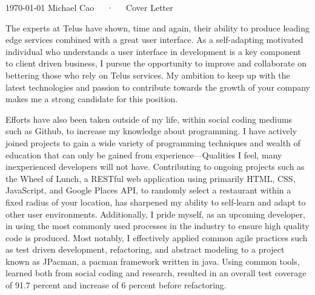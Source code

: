 \documentclass[11pt, a4paper]{awesome-cv}
\begin{document}
\makecvheader[C]

\makecvfooter
  {\today}
  {Michael Cao~~~·~~~Cover Letter}
  {}

\makelettertitle

\begin{cvletter}
The experts at Telus have shown, time and again, their ability to produce leading edge services combined with a great user interface. As a self-adapting motivated individual who understands a user interface in development is a key component to client driven business, I pursue the opportunity to improve and collaborate on bettering those who rely on Telus services. My ambition to keep up with the latest technologies and passion to contribute towards the growth of your company makes me a strong candidate for this position.

Efforts have also been taken outside of my life, within social coding mediums such as Github, to increase my knowledge about programming. I have actively joined projects to gain a wide variety of programming techniques and wealth of education that can only be gained from experience—Qualities I feel, many inexperienced developers will not have. Contributing to ongoing projects such as the Wheel of Lunch, a RESTful web application using primarily HTML, CSS, JavaScript, and Google Places API, to randomly select a restaurant within a fixed radius of your location, has sharpened my ability to self-learn and adapt to other user environments. Additionally, I pride myself, as an upcoming developer, in using the most commonly used processes in the industry to ensure high quality code is produced. Most notably, I effectively applied common agile practices such as test driven development, refactoring, and abstract modeling to a project known as JPacman, a pacman framework written in java. Using common tools, learned both from social coding and research, resulted in an overall test coverage of 91.7 percent and increase of 6 percent before refactoring.


\end{cvletter}
\end{document}
